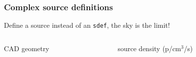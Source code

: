 \documentclass[xcolor=x11names,compress]{beamer}
\begin{document}
\begin{frame}
\frametitle{Complex source definitions}

Define a source instead of an \texttt{sdef}, the sky is the limit!

\begin{columns}[T]
    \begin{column}{.4\textwidth}
     \begin{block}{CAD geometry}
     \vspace{0.1cm}
     \end{block}
    \end{column}
    \begin{column}{.45\textwidth}
    \begin{block}{source density (p/cm$^3$/s)}
    \end{block}
    \end{column}
\end{columns}

\end{frame}
\end{document}
